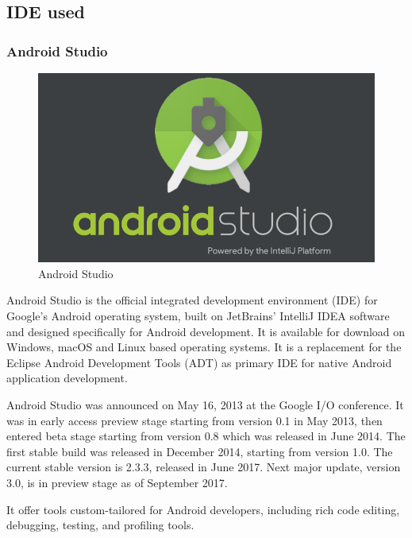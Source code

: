 \subsection{IDE used}
\subsubsection{Android Studio}

\begin{figure}[ht]
\centering
\includegraphics[scale=0.38]{images/android.png}
\caption{Android Studio}
\end{figure}

Android Studio is the official integrated development environment (IDE) for Google's Android operating system, built on JetBrains' IntelliJ IDEA software and designed specifically for Android development.
It is available for download on Windows, macOS and Linux based operating systems. It is a replacement for the Eclipse Android Development Tools (ADT) as primary IDE for native Android application development. 

Android Studio was announced on May 16, 2013 at the Google I/O conference. It was in early access preview stage starting from version 0.1 in May 2013, then entered beta stage starting from version 0.8 which was released in June 2014. The first stable build was released in December 2014, starting from version 1.0. The current stable version is 2.3.3, released in June 2017. Next major update, version 3.0, is in preview stage as of September 2017.

It offer tools custom-tailored for Android developers, including rich code editing, debugging, testing, and profiling tools.




